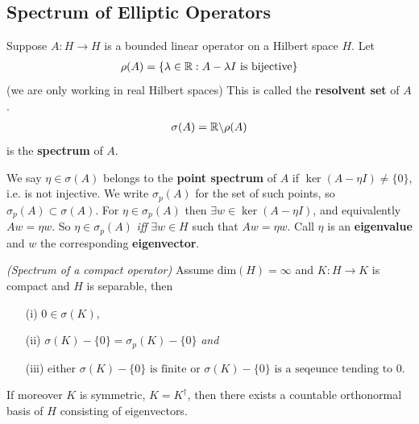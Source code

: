\documentclass[12pt,a4paper]{report}
\begin{document}
\subsection*{Spectrum of Elliptic Operators}

Suppose $A: H\rightarrow H$ is a bounded linear operator on a Hilbert space $H$. Let
\begin{align*}
\rho(A) = \{ \lambda \in \mathbb{R} : A - \lambda I \text{ is bijective} \}
\end{align*}
(we are only working in real Hilbert spaces) This is called the \textbf{resolvent set} of $A$.
\begin{align*}
\sigma(A) = \mathbb{R} \backslash \rho(A)
\end{align*}
is the \textbf{spectrum} of $A$.

\quad We say $\eta  \in \sigma (A)$ belongs to the \textbf{point spectrum} of $A$ if $\ker (A- \eta I) \neq \{ 0 \}$, i.e. is not injective. We write $\sigma_p(A)$ for the set of such points, so $\sigma_p(A) \subset \sigma(A)$. For $\eta \in \sigma_p(A)$ then $\exists w \in \ker (A- \eta I)$, and equivalently $A w = \eta w$. So $\eta \in \sigma_p (A)$ \emph{iff} $\exists w \in H$ such that $Aw = \eta w$. Call $\eta$ is an \textbf{eigenvalue}  and $w$ the corresponding \textbf{eigenvector}.
\s

\thm \emph{(Spectrum of a compact operator)} Assume $\text{dim}(H) = \infty$ and $K : H\rightarrow K$ is compact and $H$ is separable, then
\begin{itemize}
\item[(i)] $0 \in \sigma (K)$,
\item[(ii)] $\sigma(K) - \{0\} = \sigma_p(K) - \{0\}$ \emph{and}
\item[(iii)] either $\sigma(K) - \{0\} \text{ is finite}$ or $\sigma(K) - \{0\} \text{ is a seqeunce tending to 0}$.
\end{itemize}
If moreover $K$ is symmetric, $K= K^{\dagger}$, then there exists a countable orthonormal basis of $H$ consisting of eigenvectors.
\s
\end{document}

